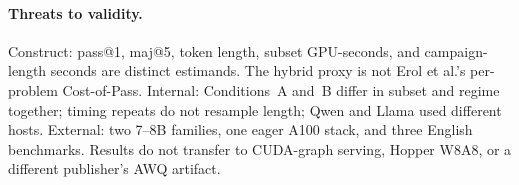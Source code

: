\documentclass[11pt,a4paper]{article}
\begin{document}
\paragraph{Threats to validity.}
Construct: pass@1, maj@5, token length, subset GPU-seconds, and campaign-length seconds are distinct estimands. The hybrid proxy is not Erol et al.'s per-problem Cost-of-Pass. Internal: Conditions~A and~B differ in subset and regime together; timing repeats do not resample length; Qwen and Llama used different hosts. External: two 7--8B families, one eager A100 stack, and three English benchmarks. Results do not transfer to CUDA-graph serving, Hopper W8A8, or a different publisher's AWQ artifact.
\end{document}
